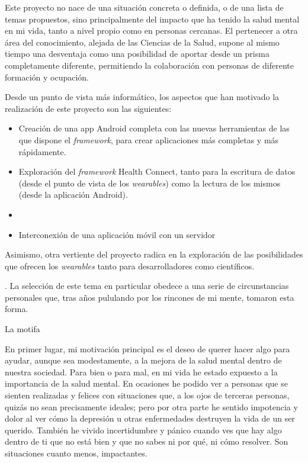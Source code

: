 Este proyecto no nace de una situación concreta o definida, o de una lista de temas propuestos, sino principalmente del impacto que ha tenido la salud mental en mi vida, tanto a nivel propio como en personas cercanas. El pertenecer a otra área del conocimiento, alejada de las Ciencias de la Salud, supone al mismo tiempo una desventaja como una posibilidad de aportar desde un prisma completamente diferente, permitiendo la colaboración con personas de diferente formación y ocupación.

Desde un punto de vista más informático, los aspectos que han motivado la realización de este proyecto son las siguientes:
\begin{itemize}
    \item Creación de una app Android completa con las nuevas herramientas de las que dispone el \textit{framework}, para crear aplicaciones más completas y más rápidamente.
    \item Exploración del \textit{framework} Health Connect, tanto para la escritura de datos (desde el punto de vista de los \textit{wearables}) como la lectura de los mismos (desde la aplicación Android).
    \item 
    \item Interconexión de una aplicación móvil con un servidor
\end{itemize}

Asimismo, otra vertiente del proyecto radica en la exploración de las posibilidades que ofrecen los \textit{wearables} tanto para desarrolladores como científicos.


. La selección de este tema en particular obedece a una serie de circunstancias personales que, tras años pululando por los rincones de mi mente, tomaron esta forma.

La motifa

En primer lugar, mi motivación principal es el deseo de querer hacer algo para ayudar, aunque sea modestamente, a la mejora de la salud mental dentro de nuestra sociedad. Para bien o para mal, en mi vida he estado expuesto a la importancia de la salud mental. En ocasiones he podido ver a personas que se sienten realizadas y felices con situaciones que, a los ojos de terceras personas, quizás no sean precisamente ideales; pero por otra parte he sentido impotencia y dolor al ver cómo la depresión u otras enfermedades destruyen la vida de un ser querido. También he vivido incertidumbre y pánico cuando ves que hay algo dentro de ti que no está bien y que no sabes ni por qué, ni cómo resolver. Son situaciones cuanto menos, impactantes.

